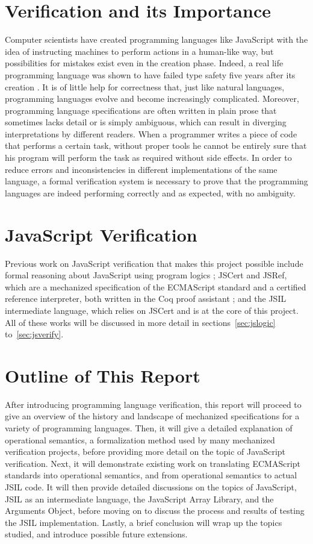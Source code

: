 \documentclass[a4paper,11pt,twoside]{report}
\begin{document}
\section{Verification and its Importance}
Computer scientists have created programming languages like JavaScript with the idea of instructing machines to perform actions in a human-like way, but possibilities for mistakes exist even in the creation phase. Indeed, a real life programming language was shown to have failed type safety five years after its creation \cite{drossopoulou1998towards}. It is of little help for correctness that, just like natural languages, programming languages evolve and become increasingly complicated. Moreover, programming language specifications are often written in plain prose that sometimes lacks detail or is simply ambiguous, which can result in diverging interpretations by different readers. When a programmer writes a piece of code that performs a certain task, without proper tools he cannot be entirely sure that his program will perform the task as required without side effects. In order to reduce errors and inconsistencies in different implementations of the same language, a formal verification system is necessary to prove that the programming languages are indeed performing correctly and as expected, with no ambiguity.

\section{JavaScript Verification}
Previous work on JavaScript verification that makes this project possible include formal reasoning about JavaScript using program logics \cite{Gardner:2012}; JSCert and JSRef, which are a mechanized specification of the ECMAScript standard and a certified reference interpreter, both written in the Coq proof assistant \cite{Bodin:2014}; and the JSIL intermediate language, which relies on JSCert and is at the core of this project. All of these works will be discussed in more detail in sections~\ref{sec:jslogic} to~\ref{sec:jsverify}.

\section{Outline of This Report}
After introducing programming language verification, this report will proceed to give an overview of the history and landscape of mechanized specifications for a variety of programming languages. Then, it will give a detailed explanation of operational semantics, a formalization method used by many mechanized verification projects, before providing more detail on the topic of JavaScript verification. Next, it will demonstrate existing work on translating ECMAScript standards into operational semantics, and from operational semantics to actual JSIL code. It will then provide detailed discussions on the topics of JavaScript, JSIL as an intermediate language, the JavaScript Array Library, and the Arguments Object, before moving on to discuss the process and results of testing the JSIL implementation. Lastly, a brief conclusion will wrap up the topics studied, and introduce possible future extensions. 
\end{document}
